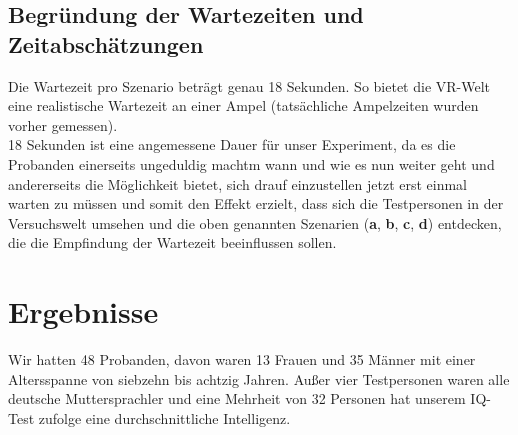 \documentclass{Paper}
\begin{document}
	\subsection{Begründung der Wartezeiten und Zeitabschätzungen}
		Die Wartezeit pro Szenario beträgt genau 18 Sekunden. So bietet die VR-Welt eine realistische Wartezeit an einer Ampel (tatsächliche Ampelzeiten wurden vorher gemessen). \\
18 Sekunden ist eine angemessene Dauer für unser Experiment, da es die Probanden einerseits ungeduldig machtm wann und wie es nun weiter geht und andererseits die Möglichkeit bietet, sich drauf einzustellen jetzt erst einmal warten zu müssen und somit den Effekt erzielt, dass sich die Testpersonen in der Versuchswelt umsehen und die oben genannten Szenarien (\textbf{a}, \textbf{b}, \textbf{c}, \textbf{d}) entdecken, die die Empfindung der Wartezeit beeinflussen sollen.

\section{Ergebnisse}
Wir hatten 48 Probanden, davon waren 13 Frauen und 35 Männer mit einer Altersspanne von siebzehn bis achtzig Jahren. Außer vier Testpersonen waren alle deutsche Muttersprachler und eine Mehrheit von 32 Personen hat unserem IQ-Test zufolge eine durchschnittliche Intelligenz.
\end{document}
